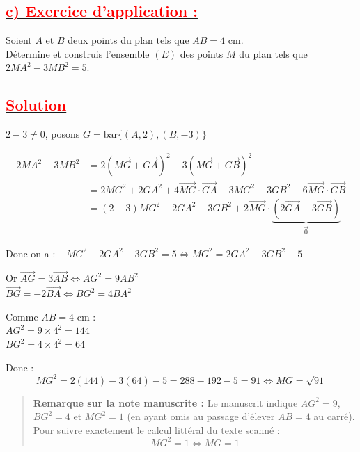 \documentclass[12pt,a4paper]{article}
\begin{document}
\subsection*{\underline{\textbf{\textcolor{red}{c) Exercice d'application :}}}}

Soient $A$ et $B$ deux points du plan tels que $AB = 4\text{ cm}$. \\
Détermine et construis l'ensemble $(E)$ des points $M$ du plan tels que $2MA^2 - 3MB^2 = 5$.

\subsection*{\underline{\textbf{\textcolor{red}{Solution}}}}

$2 - 3 \neq 0$, posons $G = \text{bar}\{(A, 2), (B, -3)\}$

\begin{align*}
2MA^2 - 3MB^2 &= 2\left(\overrightarrow{MG} + \overrightarrow{GA}\right)^2 - 3\left(\overrightarrow{MG} + \overrightarrow{GB}\right)^2 \\
&= 2MG^2 + 2GA^2 + 4\overrightarrow{MG} \cdot \overrightarrow{GA} - 3MG^2 - 3GB^2 - 6\overrightarrow{MG} \cdot \overrightarrow{GB} \\
&= (2 - 3)MG^2 + 2GA^2 - 3GB^2 + 2\overrightarrow{MG} \cdot \underbrace{\left(2\overrightarrow{GA} - 3\overrightarrow{GB}\right)}_{\vec{0}}
\end{align*}

Donc on a : $-MG^2 + 2GA^2 - 3GB^2 = 5 \iff MG^2 = 2GA^2 - 3GB^2 - 5$

\vspace{0.2cm}

Or $\overrightarrow{AG} = 3\overrightarrow{AB} \iff AG^2 = 9AB^2$ \\
$\overrightarrow{BG} = -2\overrightarrow{BA} \iff BG^2 = 4BA^2$

\vspace{0.2cm}

Comme $AB = 4\text{ cm}$ : \\
$AG^2 = 9 \times 4^2 = 144$ \\
$BG^2 = 4 \times 4^2 = 64$

\vspace{0.2cm}

Donc :
\[
MG^2 = 2(144) - 3(64) - 5 = 288 - 192 - 5 = 91 \iff MG = \sqrt{91}
\]

\begin{quote}
\textbf{Remarque sur la note manuscrite :} Le manuscrit indique $AG^2 = 9$, $BG^2 = 4$ et $MG^2 = 1$ (en ayant omis au passage d'élever $AB = 4$ au carré). Pour suivre exactement le calcul littéral du texte scanné :
\[
MG^2 = 1 \iff MG = 1
\]
\end{quote}
\end{document}
